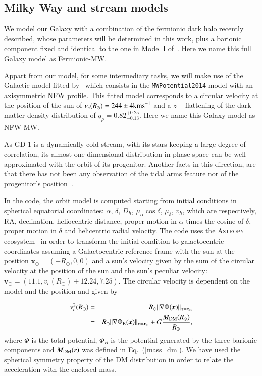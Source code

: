 \documentclass[twocolumn]{aa}
\begin{document}
\subsection{Milky Way and stream models}

We model our Galaxy with a combination of the fermionic dark halo recently described, whose parameters will be determined in this work, plus a barionic component fixed and identical to the one in Model I of~\citet{2017A&A...598A..66P}. Here we name this full Galaxy model as Fermionic-MW.

Appart from our model, for some intermediary tasks, we will make use of the Galactic model fitted
by~\citet{2019MNRAS.486.2995M} which consists in the {\texttt{MWPotential2014}}
model with an axisymmetric NFW profile. This fitted model corresponds to a circular velocity at the position of the sun of
$v_c(R_\odot)=244 \pm 4 \rm{ km s}^{-1}$ and a $z-$flattening of the dark matter density distribution of $q_\rho=0.82^{+0.25}_{-0.13}$. Here we name this Galaxy model as NFW-MW.

As GD-1 is a dynamically cold stream, with its stars keeping a large degree of correlation, its almost
one-dimensional distribution in phase-space can be well approximated with the orbit of its progenitor.
Another facts in this direction, are that there has not been any observation of the tidal arms feature
nor of the progenitor's position~\citep{2019MNRAS.486.2995M,10.1093/mnras/sty677,10.1093/mnras/sty1338,Price-Whelan_2018}.

In the code, the orbit model is computed starting from initial conditions in spherical equatorial coordinates:
$\alpha$, $\delta$, $D_h$, $\mu_\alpha \cos\delta$, $\mu_\delta$, $v_h$, which are respectively, RA, declination, heliocentric distance, proper motion in $\alpha$ times the cosine of $\delta$, proper motion in $\delta$ and helicentric radial velocity.
The code uses the {\scshape{Astropy}} ecosystem~\citep{astropy:2022, astropy:2018, astropy:2013} in order to transform the initial condition to galactocentric coordinates assuming a Galactocentric reference frame with the sun at the position $\boldsymbol{x}_\odot=(-R_\odot,0,0)$ and a sun's velocity given by the sum of the circular velocity at the position of the sun and
the sun's peculiar velocity: $\boldsymbol{v}_\odot=(11.1, v_c(R_\odot)+12.24, 7.25)$. The circular velocity is dependent on the model and the position and given by

\begin{eqnarray}
   v_c^2(R_\odot)&=& R_\odot||\nabla \Phi(\boldsymbol{x})||_{\boldsymbol{x}=\boldsymbol{x}_\odot}\nonumber\\
   &=& R_\odot||\nabla \Phi_{\rm{B}}(\boldsymbol{x})||_{\boldsymbol{x}=\boldsymbol{x}_\odot}+
   G \frac{M_{\rm{DM}}(R_\odot)}{R_\odot},
\end{eqnarray}
where $\Phi$ is the total potential, $\Phi_B$ is the potential generated by the three barionic components and $M_{\rm{DM}}(r)$ was defined in Eq.~(\ref{mass_dm}). We have used the spherical symmetry property of the DM distribution in order to relate the acceleration with the enclosed mass.
\end{document}
